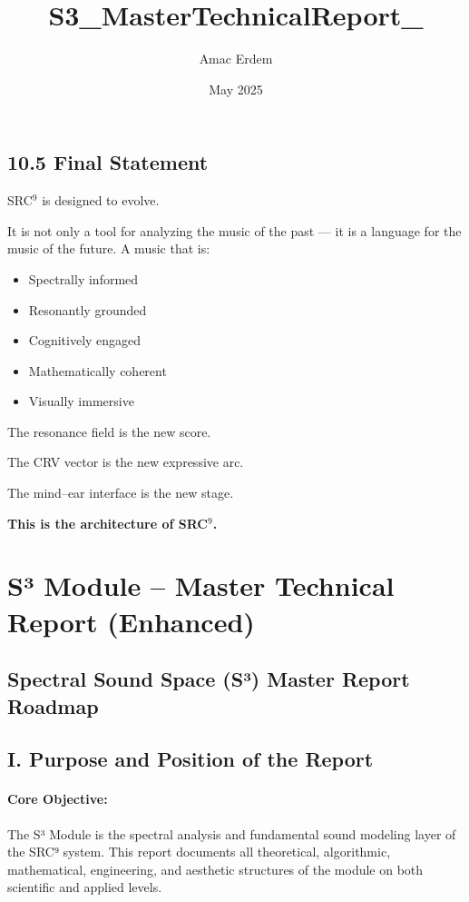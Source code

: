 \subsection*{10.5 Final Statement}

SRC$^{9}$ is designed to evolve.

It is not only a tool for analyzing the music of the past — it is a language for the music of the future. A music that is:

\begin{itemize}
    \item Spectrally informed
    \item Resonantly grounded
    \item Cognitively engaged
    \item Mathematically coherent
    \item Visually immersive
\end{itemize}

The resonance field is the new score.

The CRV vector is the new expressive arc.

The mind–ear interface is the new stage.

\textbf{This is the architecture of SRC$^{9}$.}

\title{S3_MasterTechnicalReport_}
\author{Amac Erdem}
\date{May 2025}
\section*{S³ Module – Master Technical Report (Enhanced)}

\subsection*{Spectral Sound Space (S³) Master Report Roadmap}

\subsection*{I. Purpose and Position of the Report}

\paragraph{Core Objective:}  
The S³ Module is the spectral analysis and fundamental sound modeling layer of the SRC⁹ system. This report documents all theoretical, algorithmic, mathematical, engineering, and aesthetic structures of the module on both scientific and applied levels.


